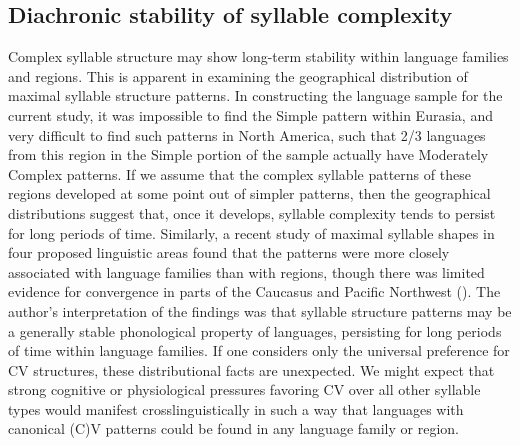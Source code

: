 \subsection{Diachronic stability of syllable complexity}\label{sec:8.5.2}

  Complex syllable structure may show long-term stability within language families and regions. This is apparent in examining the geographical distribution of maximal syllable structure patterns. In constructing the language sample for the current study, it was impossible to find the Simple pattern within Eurasia, and very difficult to find such patterns in North America, such that 2/3 languages from this region in the Simple portion of the sample actually have Moderately Complex patterns. If we assume that the complex syllable patterns of these regions developed at some point out of simpler patterns, then the geographical distributions suggest that, once it develops, syllable complexity tends to persist for long periods of time. Similarly, a recent study of maximal syllable shapes in four proposed linguistic areas found that the patterns were more closely associated with language families than with regions, though there was limited evidence for convergence in parts of the Caucasus and Pacific Northwest (\citealt{NapoleãodeSouza2017}). The author’s interpretation of the findings was that syllable structure patterns may be a generally stable phonological property of languages, persisting for long periods of time within language families. If one considers only the universal preference for CV structures, these distributional facts are unexpected. We might expect that strong cognitive or physiological pressures favoring CV over all other syllable types would manifest crosslinguistically in such a way that languages with canonical (C)V patterns could be found in any language family or region.

